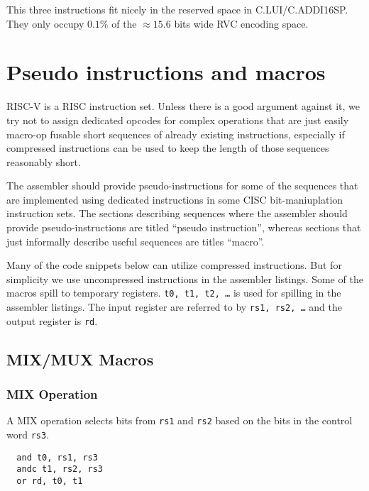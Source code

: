 

This three instructions fit nicely in the reserved space in C.LUI/C.ADDI16SP.
They only occupy $0.1\%$ of the $\approx15.6$ bits wide RVC encoding space.


\section{Pseudo instructions and macros}

RISC-V is a RISC instruction set. Unless there is a good argument against it, we try not
to assign dedicated opcodes for complex operations that are just easily macro-op fusable
short sequences of already existing instructions, especially if compressed instructions
can be used to keep the length of those sequences reasonably short.

The assembler should provide pseudo-instructions for some of the sequences that
are implemented using dedicated instructions in some CISC bit-maniuplation instruction
sets. The sections describing sequences where the assembler should provide pseudo-instructions
are titled ``pseudo instruction'', whereas sections that just informally describe useful
sequences are titles ``macro''.

Many of the code snippets below can utilize compressed instructions. But for simplicity
we use uncompressed instructions in the assembler listings. Some of the macros
spill to temporary registers. {\tt t0, t1, t2, \dots} is used for spilling in the
assembler listings. The input register are referred to by {\tt rs1, rs2, \dots} and
the output register is {\tt rd}.

\subsection{MIX/MUX Macros}

\subsubsection{MIX Operation}

A MIX operation selects bits from {\tt rs1} and {\tt rs2} based on the bits in
the control word {\tt rs3}.

\begin{verbatim}
  and t0, rs1, rs3
  andc t1, rs2, rs3
  or rd, t0, t1
\end{verbatim}

